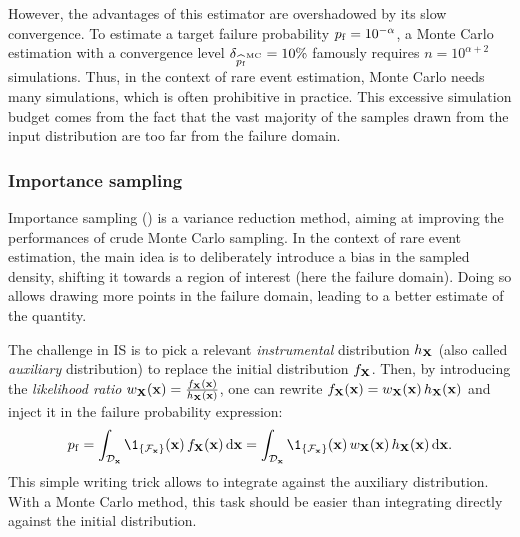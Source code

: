 However, the advantages of this estimator are overshadowed by its slow convergence. 
To estimate a target failure probability $p_\mathrm{f}=10^{-\alpha}$, 
a Monte Carlo estimation with a convergence level $\delta_{\widehat{p_\mathrm{f}}^{\textrm{MC}}} = 10\%$ famously requires $n=10^{\alpha + 2}$ simulations. 
Thus, in the context of rare event estimation, Monte Carlo needs many simulations, which is often prohibitive in practice. 
This excessive simulation budget comes from the fact that the vast majority of the samples drawn from the input distribution are too far from the failure domain.


\subsubsection{Importance sampling}

Importance sampling () is a variance reduction method, aiming at improving the performances of crude Monte Carlo sampling. 
In the context of rare event estimation, the main idea is to deliberately introduce a bias in the sampled density, shifting it towards a region of interest (here the failure domain). 
Doing so allows drawing more points in the failure domain, leading to a better estimate of the quantity.

The challenge in IS is to pick a relevant \textit{instrumental} distribution $h_{\bf X}$ (also called \textit{auxiliary} distribution) to replace the initial distribution $f_{\bf X}$. 
Then, by introducing the \textit{likelihood ratio} $w_{\bf X}({\bf x}) = \frac{f_{\bf X}({\bf x})}{h_{\bf X}({\bf x})}$, one can rewrite $f_{\bf X}({\bf x}) = w_{\bf X}({\bf x}) \, h_{\bf X}({\bf x})$ and inject it in the failure probability expression: 
\begin{equation}
    \pf = \int_{\iD_\bx} \1_{\{\iF_\bx\}}(\bx) \, f_\bX(\bx) \, \dd\bx
        = \int_{\iD_\bx} \1_{\{\iF_\bx\}}(\bx) \, w_\bX(\bx) \, h_\bX(\bx) \, \dd\bx.
\end{equation}
This simple writing trick allows to integrate against the auxiliary distribution. 
With a Monte Carlo method, this task should be easier than integrating directly against the initial distribution.


